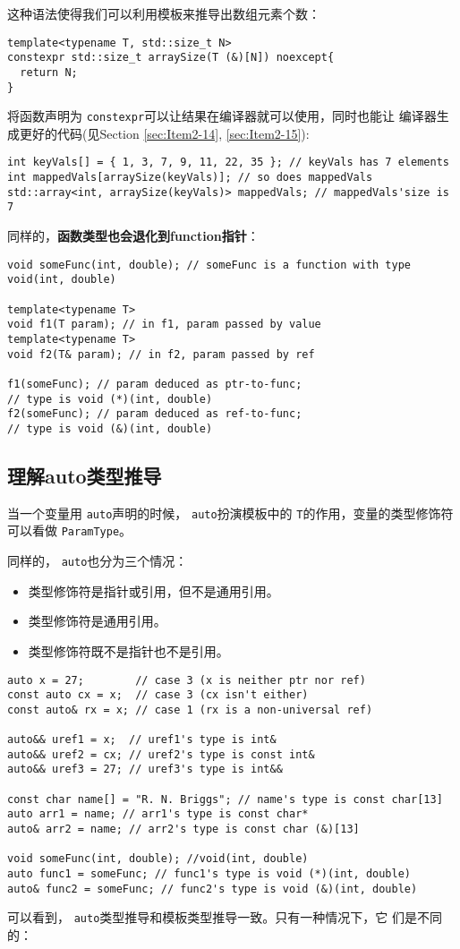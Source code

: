 \message{ !name(../CppLearning.tex)}\documentclass[a4paper,twoside]{article}
\theoremstyle{definition}
\theoremstyle{remark}
\numberwithin{equation}{section}
\let\OldTexttt\texttt
\renewcommand{\texttt}[1]{{\color{blue} \OldTexttt{#1}}}
\begin{document}
这种语法使得我们可以利用模板来推导出数组元素个数：
\begin{verbatim}
template<typename T, std::size_t N> 
constexpr std::size_t arraySize(T (&)[N]) noexcept{
  return N; 
}
\end{verbatim}

将函数声明为\texttt{constexpr}可以让结果在编译器就可以使用，同时也能让
编译器生成更好的代码(见Section \ref{sec:Item2-14}, \ref{sec:Item2-15}):
\begin{verbatim}
int keyVals[] = { 1, 3, 7, 9, 11, 22, 35 }; // keyVals has 7 elements
int mappedVals[arraySize(keyVals)]; // so does mappedVals
std::array<int, arraySize(keyVals)> mappedVals; // mappedVals'size is 7 
\end{verbatim}

同样的，\textbf{函数类型也会退化到function指针}：

\begin{verbatim}
void someFunc(int, double); // someFunc is a function with type
void(int, double)

template<typename T>
void f1(T param); // in f1, param passed by value
template<typename T>
void f2(T& param); // in f2, param passed by ref

f1(someFunc); // param deduced as ptr-to-func;
// type is void (*)(int, double)
f2(someFunc); // param deduced as ref-to-func;
// type is void (&)(int, double)
\end{verbatim}

\subsection{理解auto类型推导}
\label{sec:Item2-2}

当一个变量用\texttt{auto}声明的时候，\texttt{auto}扮演模板中的
\texttt{T}的作用，变量的类型修饰符可以看做\texttt{ParamType}。

同样的，\texttt{auto}也分为三个情况：
\begin{itemize}
\item 类型修饰符是指针或引用，但不是通用引用。
\item 类型修饰符是通用引用。
\item 类型修饰符既不是指针也不是引用。
\end{itemize}

\begin{verbatim}
auto x = 27;        // case 3 (x is neither ptr nor ref)
const auto cx = x;  // case 3 (cx isn't either)
const auto& rx = x; // case 1 (rx is a non-universal ref)

auto&& uref1 = x;  // uref1's type is int&
auto&& uref2 = cx; // uref2's type is const int&
auto&& uref3 = 27; // uref3's type is int&&

const char name[] = "R. N. Briggs"; // name's type is const char[13]
auto arr1 = name; // arr1's type is const char*
auto& arr2 = name; // arr2's type is const char (&)[13]

void someFunc(int, double); //void(int, double)
auto func1 = someFunc; // func1's type is void (*)(int, double)
auto& func2 = someFunc; // func2's type is void (&)(int, double)
\end{verbatim}
可以看到，\texttt{auto}类型推导和模板类型推导一致。只有一种情况下，它
们是不同的：
\end{document}
